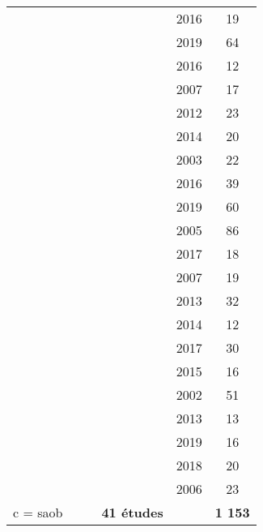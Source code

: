 \begin{tabular}{ cccccc }
\cmidrule(lr){2-6}
 & & & \citeauthor{Bluschke2016} & 2016 & 19 \\
 & & & \citeauthor{Cueli2019} & 2019 & 64 \\
 & & & \citeauthor{Deilami2016} & 2016 & 12 \\
 & & & \citeauthor{Drechsler2007} & 2007 & 17 \\
 & & & \citeauthor{Duric2012} & 2012 & 23 \\
 & & & \citeauthor{Escolano2014} & 2014 & 20 \\
 & & & \citeauthor{Fuchs2003} & 2003 & 22 \\
 & & & \citeauthor{Gelade2016} & 2016 & 39 \\
 & & & \citeauthor{Heinrich2019} & 2019 & 60 \\
 & & & \citeauthor{Kropotov2005} & 2005 & 86 \\
 & & & \citeauthor{Lee2017} & 2017 & 18 \\
 & & & \citeauthor{Leins2007} & 2007 & 19 \\
 & & & \citeauthor{Li2013} & 2013 & 32 \\
 & & & \citeauthor{Meisel2014} & 2014 & 12 \\
 & & & \citeauthor{Mohagheghi2017} & 2017 & 30 \\
 & & & \citeauthor{Mohammadi2015} & 2015 & 16 \\
 & & & \citeauthor{Monastra2002} & 2002 & 51 \\
 & & & \citeauthor{Ogrim2013} & 2013 & 13 \\
 & & & \citeauthor{Rajabi2019} & 2019 & 16 \\
 & & & \citeauthor{Sudnawa2018} & 2018 & 20 \\
 & & & \citeauthor{Strehl2006} & 2006 & 23 \\
 c = \gls{saob} & & & \textbf{41 études} & & \textbf{1 153} \\
\bottomrule
\end{tabular}
